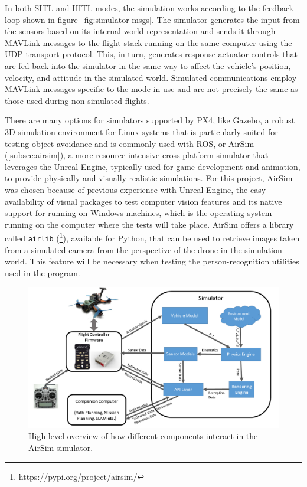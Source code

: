 In both SITL and HITL modes, the simulation works according to the feedback loop shown in figure~\ref{fig:simulator-msgs}. 
The simulator generates the input from the sensors based on its internal world representation and sends it through MAVLink messages to the flight stack running on the same computer using the UDP transport protocol.
This, in turn, generates response actuator controls that are fed back into the simulator in the same way to affect the vehicle's position, velocity, and attitude in the simulated world.
Simulated communications employ MAVLink messages specific to the mode in use and are not precisely the same as those used during non-simulated flights.

There are many options for simulators supported by PX4, like Gazebo, a robust 3D simulation environment for Linux systems that is particularly suited for testing object avoidance and is commonly used with ROS, or AirSim (\ref{subsec:airsim}), a more resource-intensive cross-platform simulator that leverages the Unreal Engine, typically used for game development and animation, to provide physically and visually realistic simulations.
For this project, AirSim was chosen because of previous experience with Unreal Engine, the easy availability of visual packages to test computer vision features and its native support for running on Windows machines, which is the operating system running on the computer where the tests will take place.
AirSim offers a library called \texttt{airlib} (\footnote{\url{https://pypi.org/project/airsim/}}), available for Python, that can be used to retrieve images taken from a simulated camera from the perspective of the drone in the simulation world.
This feature will be necessary when testing the person-recognition utilities used in the program.

\begin{figure}
  \centering
  \includegraphics[width=\textwidth,keepaspectratio]{img/airsim-overview.png}
  \caption{High-level overview of how different components interact in the AirSim simulator.}
  \label{fig:airsim-overview}
\end{figure}

